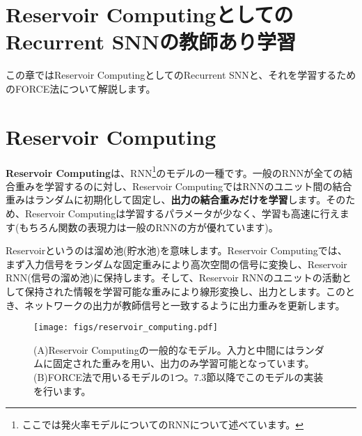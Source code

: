 \section{Reservoir ComputingとしてのRecurrent SNNの教師あり学習}
この章ではReservoir ComputingとしてのRecurrent SNNと、それを学習するためのFORCE法について解説します。
\section{Reservoir Computing}
\textbf{Reservoir Computing}は、RNN\footnote{ここでは発火率モデルについてのRNNについて述べています。}のモデルの一種です。一般のRNNが全ての結合重みを学習するのに対し、Reservoir ComputingではRNNのユニット間の結合重みはランダムに初期化して固定し、\textbf{出力の結合重みだけを学習}します。そのため、Reservoir Computingは学習するパラメータが少なく、学習も高速に行えます(もちろん関数の表現力は一般のRNNの方が優れています)。\par
Reservoirというのは溜め池(貯水池)を意味します。Reservoir Computingでは、まず入力信号をランダムな固定重みにより高次空間の信号に変換し、Reservoir RNN(信号の溜め池)に保持します。そして、Reservoir RNNのユニットの活動として保持された情報を学習可能な重みにより線形変換し、出力とします。このとき、ネットワークの出力が教師信号と一致するように出力重みを更新します。

\begin{figure}[htbp]
    \centering
    \texttt{[image: figs/reservoir\_computing.pdf]}
    \caption{(A)Reservoir Computingの一般的なモデル。入力と中間にはランダムに固定された重みを用い、出力のみ学習可能となっています。 (B)FORCE法で用いるモデルの1つ。7.3節以降でこのモデルの実装を行います。}
    \label{fig:RC}
\end{figure}
